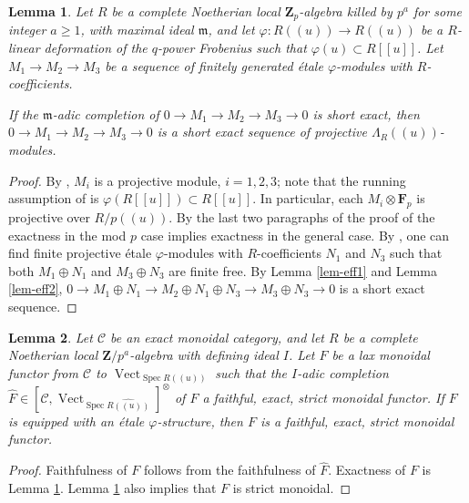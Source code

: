 \documentclass[11pt]{amsart}
\newtheorem{lem}{Lemma}
\numberwithin{thm}{section}
\numberwithin{lem}{section}
\numberwithin{cor}{section}
\numberwithin{prop}{section}
\numberwithin{exam}{section}
\numberwithin{dfn}{section}
\newcommand{\wh}[1]{\widehat{#1}}
\newcommand{\Vect}{\operatorname{Vect}}
\newcommand{\spec}{\operatorname{Spec}}
\newcommand{\fm}{\mathfrak{m}}
\newcommand{\cC}{\mathcal{C}}
\newcommand{\Z}{\mathbf{Z}}
\newcommand{\F}{\mathbf{F}}
\begin{document}
\begin{appendices}
\begin{lem}
\label{lem-eff3}
Let $R$ be a complete Noetherian local
$\Z_p$-algebra killed by $p^a$ for some integer $a\ge 1$,
with maximal ideal $\fm$,
and let $\varphi:R(\!(u)\!)\to R(\!(u)\!)$
be a $R$-linear deformation of the $q$-power Frobenius
such that $\varphi(u)\subset R[\![u]\!]$.
Let $M_1\to M_2\to M_3$ be a sequence of finitely generated
\'etale $\varphi$-modules with $R$-coefficients.

If the $\fm$-adic completion of $0\to M_1\to M_2\to M_3\to 0$
is short exact, then $0\to M_1\to M_2\to M_3\to 0$
is a short exact sequence of projective $\Lambda_R(\!(u)\!)$-modules.
\end{lem}

\begin{proof}
By \cite[Theorem 5.5.20]{EG21}, $M_i$ is a projective module, $i=1,2,3$;
note that the running assumption of \cite{EG21}
is $\varphi(R[\![u]\!])\subset R[\![u]\!]$.
In particular, each $M_i\otimes \F_p$
is projective over $R/p(\!(u)\!)$. 
By the last two paragraphs
of the proof of \cite[Theorem 5.5.20]{EG21}
the exactness in the mod $p$ case implies
exactness in the general case.
By \cite[Lemma 5.2.14]{EG21},
one can find finite projective \'etale $\varphi$-modules 
with $R$-coefficients
$N_1$ and $N_3$ such that both $M_1\oplus N_1$ and $M_3\oplus N_3$
are finite free.
By Lemma \ref{lem-eff1} and Lemma \ref{lem-eff2},
$0\to M_1\oplus N_1\to M_2\oplus N_1\oplus N_3\to M_3\oplus N_3\to 0$
is a short exact sequence.
\end{proof}


\begin{lem}
\label{lem-eff4}
Let $\cC$ be an exact monoidal category,
and let $R$ be a complete
Noetherian local $\Z/p^a$-algebra
with defining ideal $I$.
Let $F$ be a lax monoidal functor from $\cC$
to $\Vect_{\spec R(\!(u)\!)}$
such that the $I$-adic completion $\wh F\in
[\cC, \Vect_{\spec \wh{R(\!(u)\!)}}]^\otimes$ of $F$
a faithful, exact, strict monoidal functor.
If $F$ is equipped with an \'etale $\varphi$-structure,
then
$F$ is a faithful, exact, strict monoidal functor.
\end{lem}

\begin{proof}
Faithfulness of $F$ follows from the faithfulness of $\widehat F$.
Exactness of $F$ is Lemma \ref{lem-eff3}.
Lemma \ref{lem-eff3} also
implies that $F$ is strict monoidal.
\end{proof}

\end{appendices}



\printbibliography
\end{document}
